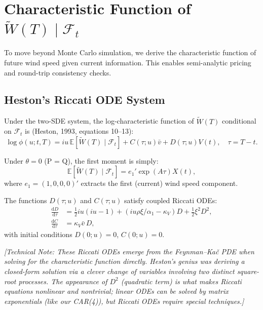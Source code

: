 \documentclass[11pt, a4paper, twoside]{article}
\begin{document}
\section{Characteristic Function of $\tilde{W}(T) \mid \mathcal{F}_t$}

To move beyond Monte Carlo simulation, we derive the characteristic function of future wind speed given current information. This enables semi-analytic pricing and round-trip consistency checks.

\subsection{Heston's Riccati ODE System}

Under the two-SDE system, the log-characteristic function of $\tilde{W}(T)$ conditional on $\mathcal{F}_t$ is (Heston, 1993, equations 10--13):
\begin{equation}
\log \phi(u; t, T) = i u \, \mathbb{E}[\tilde{W}(T) \mid \mathcal{F}_t] + C(\tau; u) \bar{v} + D(\tau; u) V(t), \quad \tau = T - t.
\end{equation}

Under $\theta = 0$ (P = Q), the first moment is simply:
\begin{equation}
\mathbb{E}[\tilde{W}(T) \mid \mathcal{F}_t] = e_1' \exp(A \tau) X(t),
\end{equation}
where $e_1 = (1, 0, 0, 0)'$ extracts the first (current) wind speed component.

The functions $D(\tau; u)$ and $C(\tau; u)$ satisfy coupled Riccati ODEs:
\begin{align}
\frac{\mathrm{d}D}{\mathrm{d}\tau} &= \frac{1}{2} i u (i u - 1) + (i u \rho \xi / \alpha_1 - \kappa_V) D + \frac{1}{2} \xi^2 D^2, \label{eq:riccati_d} \\
\frac{\mathrm{d}C}{\mathrm{d}\tau} &= \kappa_V \bar{v} \, D, \label{eq:riccati_c}
\end{align}
with initial conditions $D(0; u) = 0$, $C(0; u) = 0$.

\textit{[Technical Note: These Riccati ODEs emerge from the Feynman--Kač PDE when solving for the characteristic function directly. Heston's genius was deriving a closed-form solution via a clever change of variables involving two distinct square-root processes. The appearance of $D^2$ (quadratic term) is what makes Riccati equations nonlinear and nontrivial; linear ODEs can be solved by matrix exponentials (like our CAR(4)), but Riccati ODEs require special techniques.]}
\end{document}
